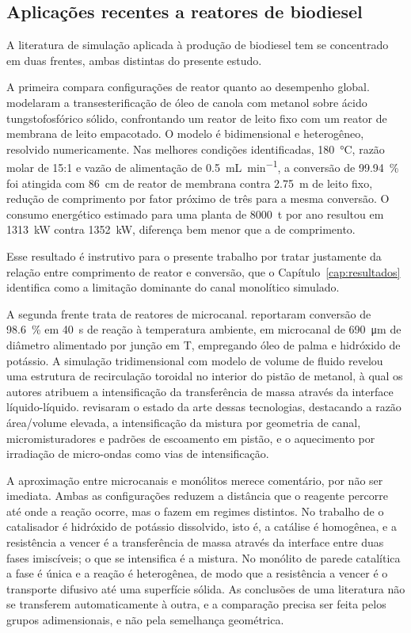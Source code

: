 \subsection{Aplicações recentes a reatores de biodiesel}

A literatura de simulação aplicada à produção de biodiesel tem se concentrado em
duas frentes, ambas distintas do presente estudo.

A primeira compara configurações de reator quanto ao desempenho global.
\textcite{Omranpour2024} modelaram a transesterificação de óleo de canola com
metanol sobre ácido tungstofosfórico sólido, confrontando um reator de leito
fixo com um reator de membrana de leito empacotado. O modelo é bidimensional e
heterogêneo, resolvido numericamente. Nas melhores condições identificadas,
\SI{180}{\celsius}, razão molar de \num{15}:\num{1} e vazão de alimentação de
\SI{0.5}{\milli\liter\per\minute}, a conversão de \SI{99.94}{\percent} foi
atingida com \SI{86}{\centi\meter} de reator de membrana contra
\SI{2.75}{\meter} de leito fixo, redução de comprimento por fator
próximo de três para a mesma conversão. O consumo energético estimado para uma
planta de \SI{8000}{\tonne} por ano resultou em \SI{1313}{\kilo\watt} contra
\SI{1352}{\kilo\watt}, diferença bem menor que a de comprimento.

Esse resultado é instrutivo para o presente trabalho por tratar justamente da
relação entre comprimento de reator e conversão, que o
Capítulo~\ref{cap:resultados} identifica como a limitação dominante do canal
monolítico simulado.

A segunda frente trata de reatores de microcanal. \textcite{Laziz2020}
reportaram conversão de \SI{98.6}{\percent} em \SI{40}{\second} de reação à
temperatura ambiente, em microcanal de \SI{690}{\micro\meter} de diâmetro
alimentado por junção em T, empregando óleo de palma e hidróxido de potássio.
A simulação tridimensional com modelo de volume de fluido revelou uma estrutura
de recirculação toroidal no interior do pistão de metanol, à qual os autores
atribuem a intensificação da transferência de massa através da interface
líquido-líquido. \textcite{Subramaniam2024} revisaram o estado da arte dessas
tecnologias, destacando a razão área/volume elevada, a intensificação da mistura
por geometria de canal, micromisturadores e padrões de escoamento em pistão, e o
aquecimento por irradiação de micro-ondas como vias de intensificação.

A aproximação entre microcanais e monólitos merece comentário, por não ser
imediata. Ambas as configurações reduzem a distância que o reagente percorre até
onde a reação ocorre, mas o fazem em regimes distintos. No trabalho de
\textcite{Laziz2020} o catalisador é hidróxido de potássio dissolvido, isto é, a
catálise é homogênea, e a resistência a vencer é a transferência de massa
através da interface entre duas fases imiscíveis; o que se intensifica é a
mistura. No monólito de parede catalítica a fase é única e a reação é
heterogênea, de modo que a resistência a vencer é o transporte difusivo até uma
superfície sólida. As conclusões de uma literatura não se transferem
automaticamente à outra, e a comparação precisa ser feita pelos grupos
adimensionais, e não pela semelhança geométrica.
